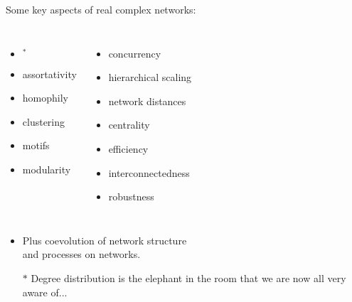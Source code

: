 \begin{frame}

  \begin{block}{Some key aspects of real complex networks:}
  \begin{columns}
    \begin{itemize}
    \item {}$^\ast$
    \item assortativity
    \item homophily
    \item clustering
    \item motifs
    \item modularity
    \end{itemize}
    \begin{itemize}
    \item concurrency
    \item hierarchical scaling
    \item network distances
    \item centrality
    \item efficiency
    \item interconnectedness
    \item robustness
    \end{itemize}
  \end{columns}
  \end{block}

  \begin{itemize}
  \item<1-> 
    Plus coevolution of network structure 
    \\ and processes on networks.
  \item[$\ast$]
    Degree distribution is the elephant in the room that
    we are now all very aware of...
  \end{itemize}

\end{frame}

